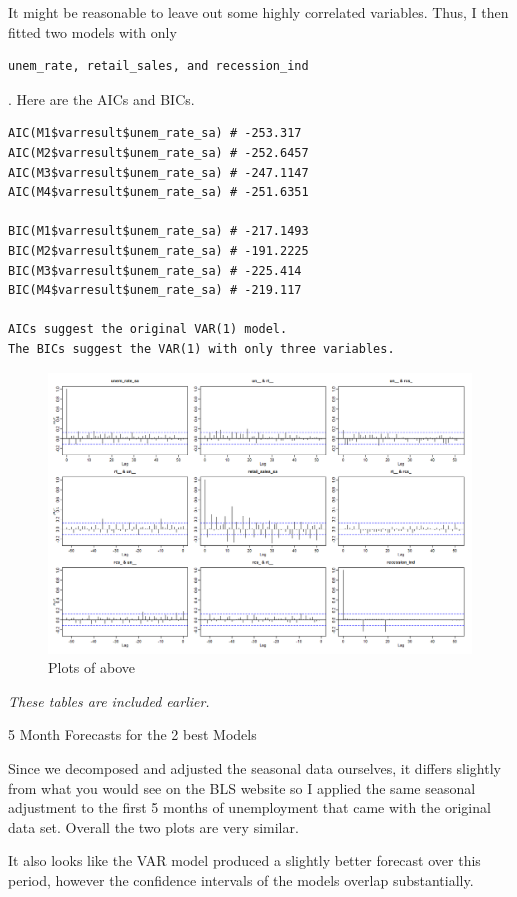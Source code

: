 \documentclass[twoside,twocolumn]{article}
\begin{document}
It might be reasonable to leave out some highly correlated variables. Thus, I then fitted two models with only \begin{verbatim}unem_rate, retail_sales, and recession_ind\end{verbatim}. Here are the AICs and BICs.

\begin{verbatim}
AIC(M1$varresult$unem_rate_sa) # -253.317
AIC(M2$varresult$unem_rate_sa) # -252.6457
AIC(M3$varresult$unem_rate_sa) # -247.1147
AIC(M4$varresult$unem_rate_sa) # -251.6351

BIC(M1$varresult$unem_rate_sa) # -217.1493
BIC(M2$varresult$unem_rate_sa) # -191.2225
BIC(M3$varresult$unem_rate_sa) # -225.414
BIC(M4$varresult$unem_rate_sa) # -219.117

AICs suggest the original VAR(1) model. 
The BICs suggest the VAR(1) with only three variables. 
\end{verbatim}

    \begin{figure}[htb]
    	\centering
     	\caption{Plots of above}
     	\includegraphics[width=\linewidth]{images/boplots}
 \end{figure}


\textit{These tables are included earlier.}

5 Month Forecasts for the 2 best Models

Since we decomposed and adjusted the seasonal data ourselves, it differs slightly from what you would see on the BLS website so I applied the same seasonal adjustment to the first 5 months of unemployment that came with the original data set. Overall the two plots are very similar.

It also looks like the VAR model produced a slightly better forecast over this period, however the confidence intervals of the models overlap substantially.
\end{document}
